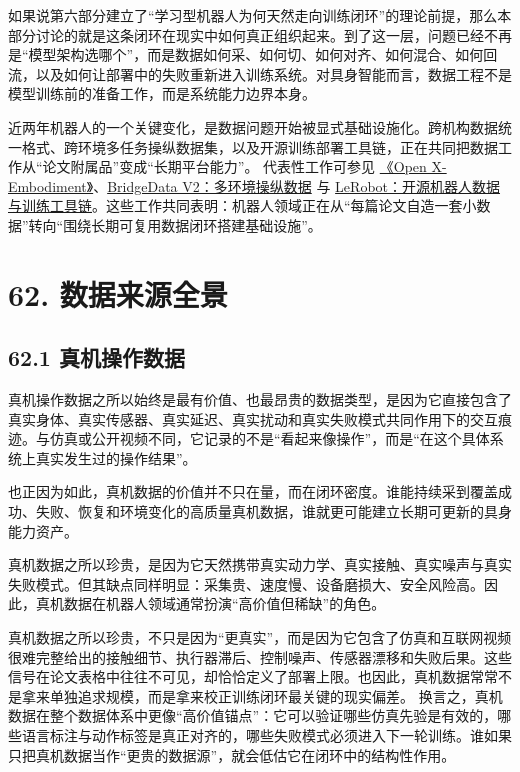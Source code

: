 

如果说第六部分建立了“学习型机器人为何天然走向训练闭环”的理论前提，那么本部分讨论的就是这条闭环在现实中如何真正组织起来。到了这一层，问题已经不再是“模型架构选哪个”，而是数据如何采、如何切、如何对齐、如何混合、如何回流，以及如何让部署中的失败重新进入训练系统。对具身智能而言，数据工程不是模型训练前的准备工作，而是系统能力边界本身。

近两年机器人的一个关键变化，是数据问题开始被显式基础设施化。跨机构数据统一格式、跨环境多任务操纵数据集，以及开源训练部署工具链，正在共同把数据工作从“论文附属品”变成“长期平台能力”。 代表性工作可参见 \href{https://arxiv.org/abs/2310.08864}{《Open X-Embodiment》}、\href{https://arxiv.org/abs/2308.12952}{BridgeData V2：多环境操纵数据} 与 \href{https://arxiv.org/abs/2602.22818}{LeRobot：开源机器人数据与训练工具链}。这些工作共同表明：机器人领域正在从“每篇论文自造一套小数据”转向“围绕长期可复用数据闭环搭建基础设施”。

\section*{62. 数据来源全景}

\subsection*{62.1 真机操作数据}


真机操作数据之所以始终是最有价值、也最昂贵的数据类型，是因为它直接包含了真实身体、真实传感器、真实延迟、真实扰动和真实失败模式共同作用下的交互痕迹。与仿真或公开视频不同，它记录的不是“看起来像操作”，而是“在这个具体系统上真实发生过的操作结果”。

也正因为如此，真机数据的价值并不只在量，而在闭环密度。谁能持续采到覆盖成功、失败、恢复和环境变化的高质量真机数据，谁就更可能建立长期可更新的具身能力资产。

真机数据之所以珍贵，是因为它天然携带真实动力学、真实接触、真实噪声与真实失败模式。但其缺点同样明显：采集贵、速度慢、设备磨损大、安全风险高。因此，真机数据在机器人领域通常扮演“高价值但稀缺”的角色。

真机数据之所以珍贵，不只是因为“更真实”，而是因为它包含了仿真和互联网视频很难完整给出的接触细节、执行器滞后、控制噪声、传感器漂移和失败后果。这些信号在论文表格中往往不可见，却恰恰定义了部署上限。也因此，真机数据常常不是拿来单独追求规模，而是拿来校正训练闭环最关键的现实偏差。 换言之，真机数据在整个数据体系中更像“高价值锚点”：它可以验证哪些仿真先验是有效的，哪些语言标注与动作标签是真正对齐的，哪些失败模式必须进入下一轮训练。谁如果只把真机数据当作“更贵的数据源”，就会低估它在闭环中的结构性作用。

